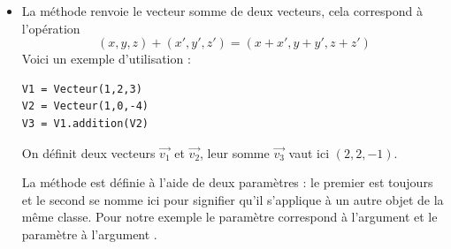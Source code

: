 \documentclass[11pt,class=report,crop=false]{standalone}
\begin{document}
\begin{cours}
\begin{itemize}
  \item La méthode  renvoie le vecteur somme de deux vecteurs, cela correspond à l'opération 
  $$(x,y,z)+(x',y',z') = (x+x',y+y',z+z')$$
  Voici un exemple d'utilisation :
\begin{lstlisting}  
V1 = Vecteur(1,2,3)
V2 = Vecteur(1,0,-4)
V3 = V1.addition(V2)
\end{lstlisting} 
On définit deux vecteurs $\vec{v_1}$ et $\vec{v_2}$, leur somme $\vec{v_3}$ vaut ici $(2,2,-1)$.

   La méthode  est définie à l'aide de deux paramètres : le premier est toujours  et le second se nomme ici  pour signifier qu'il s'applique à un autre objet de la même classe.
   Pour notre exemple le paramètre  correspond à l'argument  et le paramètre  à l'argument .
   
\end{itemize}
\end{cours}
\end{document}
